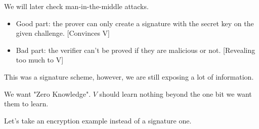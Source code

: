 \documentclass{article}
\begin{document}
We will later check man-in-the-middle attacks.

\begin{itemize}
    \item Good part: the prover can only create a signature with the secret key on the given challenge. [Convinces V]
    \item Bad part: the verifier can't be proved if they are malicious or not. [Revealing too much to V]
\end{itemize}

This was a signature scheme, however, we are still exposing a lot of information.

We want "Zero Knowledge". $V$ should learn nothing beyond the one bit we want them to learn.

\pagebreak

Let's take an encryption example instead of a signature one.
\end{document}
